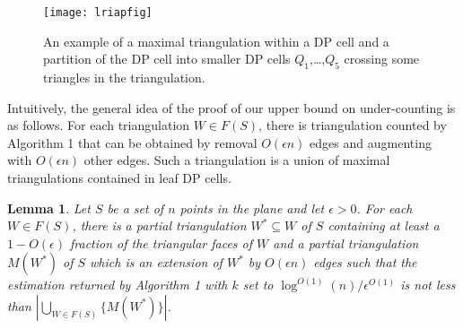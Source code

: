 \documentclass[a4paper]{article}
\newtheorem{lemma}{Lemma}
\begin{document}
\begin{figure}
\centering
\texttt{[image: lriapfig]}
\caption{An example of a maximal triangulation
within a DP cell and a partition of the DP cell into
smaller DP cells $Q_1$,\dots,$Q_5$ crossing some
triangles in the triangulation.}

\label{fig. 2}
\end{figure}

Intuitively, the general idea of the proof
of our upper bound on under-counting is
as follows. For each triangulation $W\in F(S)$,
there is triangulation counted by Algorithm 1
that can be obtained by removal $O(\epsilon n)$
edges and augmenting with $O(\epsilon n)$
other edges. Such a triangulation
is a union of maximal triangulations
contained in leaf DP cells.

\begin{lemma}\label{lem: under}
Let $S$ be a set of $n$ points in the plane
and let $\epsilon >0$.
For each $W\in F(S)$, there is a partial
triangulation $W^*\subseteq W$ of $S$
containing at least a $1-O(\epsilon)$ 
fraction of the triangular faces
of $W$ and a partial triangulation
$M(W^*)$ of $S$ which is an extension
of $W^*$ by $O(\epsilon n)$ edges
such that
the estimation returned by
Algorithm 1 with $k$ set to
$\log^{O(1)} (n)/\epsilon^{O(1)}$ is not less
than  $|\bigcup_{W\in F(S)} \{ M(W^*)\}|$.
\end{lemma}
\end{document}
